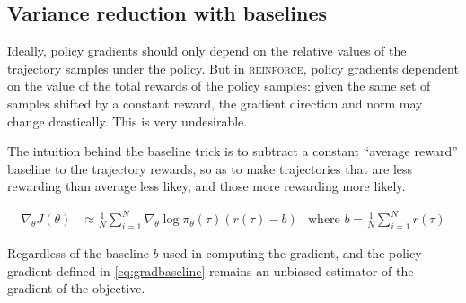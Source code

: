 \documentclass{article}
\begin{document}
\subsection{Variance reduction with baselines}

Ideally, policy gradients should only depend on the relative values of the trajectory samples under the policy. But in \textsc{reinforce}, policy gradients dependent on the value of the total rewards of the policy samples: given the same set of samples shifted by a constant reward, the gradient direction and norm may change drastically. This is very undesirable.

The intuition behind the baseline trick is to subtract a constant ``average reward'' baseline to the trajectory rewards, so as to make trajectories that are less rewarding than average less likey, and those more rewarding more likely.

\begin{align}
    \nabla_\theta J(\theta) 
        &\approx \frac{1}{N} \sum_{i=1}^N\nabla_\theta\log\pi_\theta\left(\tau\right)\left(r\left(\tau\right)-b\right) &\text{where }b=\frac{1}{N} \sum_{i=1}^{N} r(\tau) \label{eq:gradbaseline}
\end{align}

Regardless of the baseline $b$ used in computing the gradient, and the policy gradient defined in \eqref{eq:gradbaseline} remains an unbiased estimator of the gradient of the objective.
\end{document}
